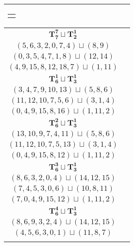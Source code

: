 \documentclass{article}
\begin{document}
\begin{longtable}{|c|c|}
\begin{tabular}{c}
        $(4,9,15,8,12,7,16)\sqcup(1,11)$
        \end{tabular} \\ 
        \hline
        $\mathbf{T_{7}^{7}} \sqcup \mathbf{T_{2}^{1}}$ & \begin{tabular}{c}
        $(2,4,6,9,12,1,8)\sqcup(14,15)$ \\ 
        $(5,6,3,2,0,7,4)\sqcup(8,9)$ \\ 
        $(0,3,5,4,7,1,8)\sqcup(12,14)$ \\ 
        $(4,9,15,8,12,18,7)\sqcup(1,11)$
        \end{tabular} \\ 
        \hline
        $\mathbf{T_{6}^{1}} \sqcup \mathbf{T_{3}^{1}}$ & \begin{tabular}{c}
        $(1,2,4,6,9,12)\sqcup(13,14,15)$ \\ 
        $(3,4,7,9,10,13)\sqcup(5,8,6)$ \\ 
        $(11,12,10,7,5,6)\sqcup(3,1,4)$ \\ 
        $(0,4,9,15,8,16)\sqcup(1,11,2)$
        \end{tabular} \\ 
        \hline
        $\mathbf{T_{6}^{2}} \sqcup \mathbf{T_{3}^{1}}$ & \begin{tabular}{c}
        $(1,2,4,6,9,5)\sqcup(13,14,15)$ \\ 
        $(13,10,9,7,4,11)\sqcup(5,8,6)$ \\ 
        $(11,12,10,7,5,13)\sqcup(3,1,4)$ \\ 
        $(0,4,9,15,8,12)\sqcup(1,11,2)$
        \end{tabular} \\ 
        \hline
        $\mathbf{T_{6}^{3}} \sqcup \mathbf{T_{3}^{1}}$ & \begin{tabular}{c}
        $(0,1,2,4,6,5)\sqcup(16,13,14)$ \\ 
        $(8,6,3,2,0,4)\sqcup(14,12,15)$ \\ 
        $(7,4,5,3,0,6)\sqcup(10,8,11)$ \\ 
        $(7,0,4,9,15,12)\sqcup(1,11,2)$
        \end{tabular} \\ 
        \hline
        $\mathbf{T_{6}^{4}} \sqcup \mathbf{T_{3}^{1}}$ & \begin{tabular}{c}
        $(1,2,5,4,6,7)\sqcup(16,14,13)$ \\ 
        $(8,6,9,3,2,4)\sqcup(14,12,15)$ \\ 
        $(4,5,6,3,0,1)\sqcup(11,8,7)$ \\ 

\end{tabular}
\end{longtable}
\end{document}

